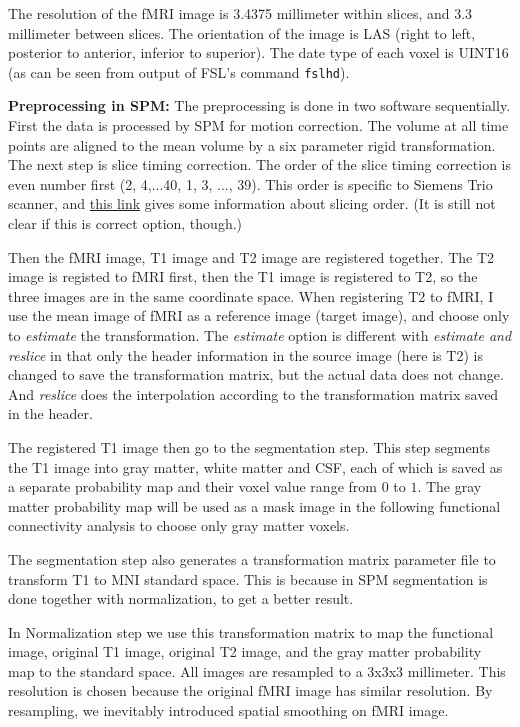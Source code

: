 \documentclass[12pt]{article}
\begin{document}
The resolution of the fMRI image is 3.4375 millimeter within slices, and 3.3 millimeter between slices. The orientation of the image is LAS (right to left, posterior to anterior, inferior to superior). The date type of each voxel is UINT16 (as can be seen from output of FSL's command \texttt{fslhd}).

\textbf{Preprocessing in SPM: } The preprocessing is done in two software sequentially. First the data is processed by SPM for motion correction. The volume at all time points are aligned to the mean volume by a six parameter rigid transformation. The next step is slice timing correction. The order of the slice timing correction is even number first (2, 4,...40, 1, 3, ..., 39). This order is specific to Siemens Trio scanner, and \href{https://mri.radiology.uiowa.edu/fmri_images.html}{this link} gives some information about slicing order. (It is still not clear if this is correct option, though.)

Then the fMRI image, T1 image and T2 image are registered together. The T2 image is registed to fMRI first, then the T1 image is registered to T2, so the three images are in the same coordinate space. When registering T2 to fMRI, I use the mean image of fMRI as a reference image (target image), and choose only to \emph{estimate} the transformation. The \emph{estimate} option is different with \emph{estimate and reslice} in that only the header information in the source image (here is T2) is changed to save the transformation matrix, but the actual data does not change. And \emph{reslice} does the interpolation according to the transformation matrix saved in the header.

The registered T1 image then go to the segmentation step. This step segments the T1 image into gray matter, white matter and CSF, each of which is saved as a separate probability map and their voxel value range from $0$ to $1$. The gray matter probability map will be used as a mask image in the following functional connectivity analysis to choose only gray matter voxels.

The segmentation step also generates a transformation matrix parameter file to transform T1 to MNI standard space. This is because in SPM segmentation is done together with normalization, to get a better result. 

In Normalization step we use this transformation matrix to map the functional image, original T1 image, original T2 image, and the gray matter probability map to the standard space. All images are resampled to a 3x3x3 millimeter. This resolution is chosen because the original fMRI image has similar resolution. By resampling, we inevitably introduced spatial smoothing on fMRI image.
\end{document}
